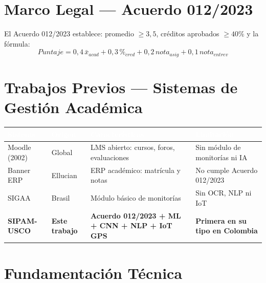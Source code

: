 \documentclass[12pt,a4paper,twoside]{report}
\begin{document}
\section{Marco Legal — Acuerdo 012/2023}

El Acuerdo 012/2023 establece: promedio $\geq 3{,}5$, créditos aprobados $\geq 40\%$ y la fórmula:
\begin{equation}
\boxed{Puntaje = 0{,}4\,\bar{x}_{acad} + 0{,}3\,\%_{cred} + 0{,}2\,nota_{asig} + 0{,}1\,nota_{entrev}}
\end{equation}

\section{Trabajos Previos — Sistemas de Gestión Académica}

\begin{center}
\begin{tabularx}{\textwidth}{|l|l|X|p{3cm}|}
\hline
\rowcolor{tableHdr}
\textcolor{white}{\textbf{Sistema}} &
\textcolor{white}{\textbf{Origen}} &
\textcolor{white}{\textbf{Características}} &
\textcolor{white}{\textbf{Limitación}} \\
\hline
\rowcolor{rowOdd}Moodle (2002) & Global & LMS abierto: cursos, foros, evaluaciones & Sin módulo de monitorías ni IA \\
\hline
\rowcolor{rowEven}Banner ERP & Ellucian & ERP académico: matrícula y notas & No cumple Acuerdo 012/2023 \\
\hline
\rowcolor{rowOdd}SIGAA & Brasil & Módulo básico de monitorías & Sin OCR, NLP ni IoT \\
\hline
\rowcolor{rowEven}\textbf{SIPAM-USCO} & \textbf{Este trabajo} & \textbf{Acuerdo 012/2023 + ML + CNN + NLP + IoT GPS} & \textbf{Primera en su tipo en Colombia} \\
\hline
\end{tabularx}
\end{center}

\section{Fundamentación Técnica}
\end{document}
